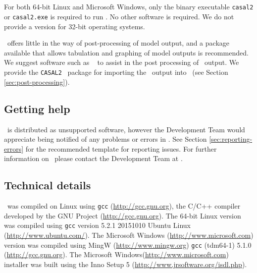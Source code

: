 \subsection{}

For both 64-bit Linux and Microsoft Windows, only the binary executable \texttt{casal2} or \texttt{casal2.exe} is required to run \CNAME . No other software is required. We do not provide a version for 32-bit operating systems. 

\CNAME\ offers little in the way of post-processing of model output, and a package available that allows tabulation and graphing of model outputs is recommended. We suggest software such as \href{http://www.r-project.org}{\R}\ \citep{R} to assist in the post processing of \CNAME\ output. We provide the \texttt{CASAL2} \R\ package for importing the \CNAME\ output into \R\ (see Section \ref{sec:post-processing}).

\subsection{Getting help}

\CNAME\ is distributed as unsupported software, however the Development Team would appreciate being notified of any problems or errors in \CNAME. See Section \ref{sec:reporting-errors} for the recommended template for reporting issues. For further information on \CNAME\, please contact the Development Team at \email .

\subsection{Technical details}\label{sec:tech}

\CNAME\ was compiled on Linux using \texttt{gcc} (\url{http://gcc.gnu.org}), the C/C++ compiler developed by the GNU Project (\url{http://gcc.gnu.org}). The 64-bit Linux  version was compiled using \texttt{gcc} version 5.2.1 20151010 Ubuntu Linux (\url{http://www.ubuntu.com/}). The Microsoft Windows (\url{http://www.microsoft.com}) version was compiled using MingW (\url{http://www.mingw.org}) \texttt{gcc} (tdm64-1) 5.1.0 (\url{http://gcc.gnu.org}). The Microsoft Windows(\url{http://www.microsoft.com}) installer was built using the Inno Setup 5 (\url{http://www.jrsoftware.org/isdl.php}).

